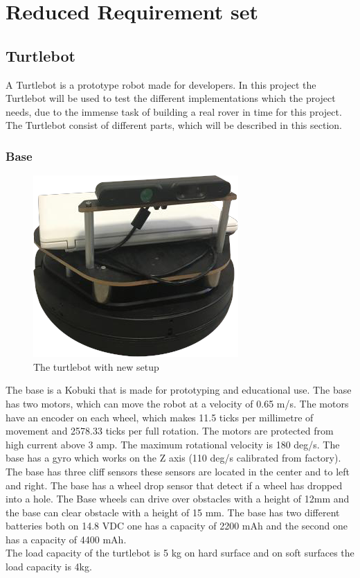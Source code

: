 \chapter{Reduced Requirement set} \label{ch:Reduced Requirement Set}

\section{Turtlebot} %
A Turtlebot is a prototype robot made for developers. In this project the Turtlebot will be used to test the different implementations which the project needs, due to the immense task of building a real rover in time for this project.\\
The Turtlebot consist of different parts, which will be described in this section.

\subsection{Base} %
\begin{figure}[h]
    \centering
    \includegraphics[width=.5\textwidth]{figures/turtlebot001.png}
    \caption{The turtlebot with new setup} 
    \label{fig:turtlebot} 
\end{figure}
The base is a Kobuki that is made for prototyping and educational use. The base has two motors, which can move the robot at a velocity of 0.65 m/s. The motors have an encoder on each wheel, which makes 11.5 ticks per millimetre of movement and 2578.33 ticks per full rotation. The motors are protected from high current above 3 amp. The maximum rotational velocity is 180 deg/s. The base has a gyro which works on the Z axis (110 deg/s calibrated from factory).\\
The base has three cliff sensors these sensors are located in the center and to left and right. The base has a wheel drop sensor that detect if a wheel has dropped into a hole. The Base wheels can drive over obstacles with a height of 12mm and the base can clear obstacle with a height of 15 mm. The base has two different batteries both on 14.8 VDC one has a capacity of 2200 mAh and the second one has a capacity of 4400 mAh.\\
The load capacity of the turtlebot is 5 kg on hard surface and on soft surfaces the load capacity is 4kg\cite{Base}.




